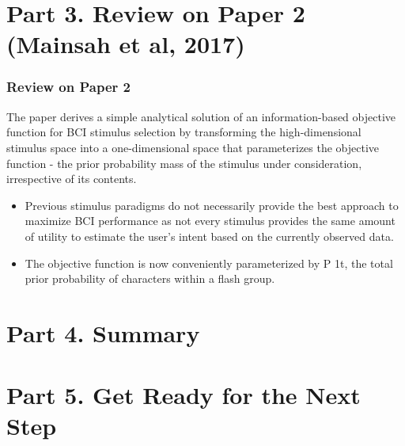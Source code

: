 \documentclass{beamer}
\begin{document}
	\section{Part 3. Review on Paper 2 (Mainsah et al, 2017)}
	\begin{frame}[t]
		\frametitle{Review on Paper 2}
		The paper derives a simple analytical solution of an information-based objective function for BCI stimulus selection by transforming the high-dimensional stimulus space into a one-dimensional space that parameterizes the objective function - the prior probability mass of the stimulus under consideration, irrespective of its contents. 
		\begin{itemize}
			\justifying
			\item Previous stimulus paradigms do not necessarily provide the best approach to maximize BCI performance as not every stimulus provides the same amount of utility to estimate the user's intent based on the currently observed data.
			\item The objective function is now conveniently parameterized by P 1t, the total prior probability of characters within a flash group.
		\end{itemize}
		
	\end{frame}

	\section{Part 4. Summary}


	
	\section{Part 5. Get Ready for the Next Step}
		
	
\end{document}

